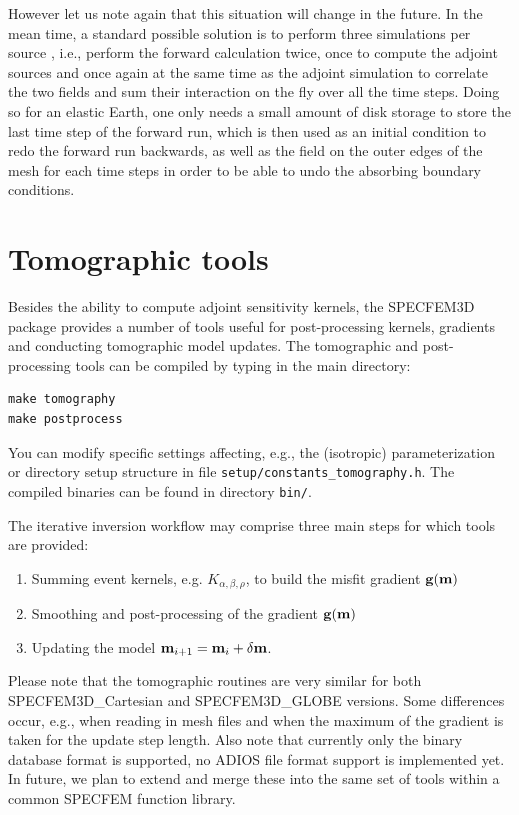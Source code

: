 However let us note again that this situation will change in the future.
In the mean time, a standard possible solution is to perform three simulations per source \cite[]{TrKoLi08,PeKoLuMaLeCaLeMaLiBlNiBaTr11},
i.e., perform the forward calculation twice, once to compute the adjoint sources and once again
at the same time as the adjoint simulation to correlate the two fields and sum their interaction on the fly over all the time steps.
Doing so for an elastic Earth, one only needs a small amount of disk storage to store the last time
step of the forward run, which is then used as an initial condition to redo the forward run backwards,
as well as the field on the outer edges of the mesh for each time steps in order to be able to undo the absorbing boundary conditions.\newline

\section{Tomographic tools}

Besides the ability to compute adjoint sensitivity kernels, the SPECFEM3D package provides a number of tools useful for post-processing kernels, gradients and conducting tomographic model updates. The tomographic and post-processing tools can be compiled by typing in the main directory:
\begin{verbatim}
make tomography
make postprocess
\end{verbatim}
You can modify specific settings affecting, e.g., the (isotropic) parameterization or directory setup structure in file \texttt{setup/constants\_tomography.h}. The compiled binaries can be found in directory \texttt{bin/}.\newline


\noindent
The iterative inversion workflow may comprise three main steps for which tools are provided:
\begin{enumerate}
\item Summing event kernels, e.g. $K_{\alpha,\beta,\rho}$, to build the misfit gradient $\mathbf{g}(\mathbf{m})$
\item Smoothing and post-processing of the gradient $\mathbf{g}(\mathbf{m})$
\item Updating the model $\mathbf{m}_{i+1} = \mathbf{m}_i + \delta\mathbf{m}$.
\end{enumerate}


Please note that the tomographic routines are very similar for both SPECFEM3D\_Cartesian and SPECFEM3D\_GLOBE versions. Some differences occur, e.g., when reading in mesh files and when the maximum of the gradient is taken for the update step length. Also note that currently only the binary database format is supported, no ADIOS file format support is implemented yet. In future, we plan to extend and merge these into the same set of tools within a common SPECFEM function library.\newline


